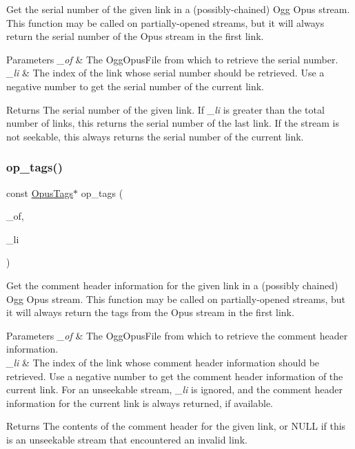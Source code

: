 Get the serial number of the given link in a (possibly-\/chained) Ogg Opus stream. This function may be called on partially-\/opened streams, but it will always return the serial number of the Opus stream in the first link. 
\begin{DoxyParams}{Parameters}
{\em \+\_\+of} & The {\ttfamily Ogg\+Opus\+File} from which to retrieve the serial number. \\
\hline
{\em \+\_\+li} & The index of the link whose serial number should be retrieved. Use a negative number to get the serial number of the current link. \\
\hline
\end{DoxyParams}
\begin{DoxyReturn}{Returns}
The serial number of the given link. If {\itshape \+\_\+li} is greater than the total number of links, this returns the serial number of the last link. If the stream is not seekable, this always returns the serial number of the current link. 
\end{DoxyReturn}
\mbox{\label{group__stream__info_ga4b9b8b62a9fb04aee64c288e106a4822}} 
\subsubsection{\texorpdfstring{op\_tags()}{op\_tags()}}
{\footnotesize\ttfamily const \mbox{\hyperlink{struct_opus_tags}{Opus\+Tags}}$\ast$ op\+\_\+tags (\begin{DoxyParamCaption}\item[{const Ogg\+Opus\+File $\ast$}]{\+\_\+of,  }\item[{int}]{\+\_\+li }\end{DoxyParamCaption})}

Get the comment header information for the given link in a (possibly chained) Ogg Opus stream. This function may be called on partially-\/opened streams, but it will always return the tags from the Opus stream in the first link. 
\begin{DoxyParams}{Parameters}
{\em \+\_\+of} & The {\ttfamily Ogg\+Opus\+File} from which to retrieve the comment header information. \\
\hline
{\em \+\_\+li} & The index of the link whose comment header information should be retrieved. Use a negative number to get the comment header information of the current link. For an unseekable stream, {\itshape \+\_\+li} is ignored, and the comment header information for the current link is always returned, if available. \\
\hline
\end{DoxyParams}
\begin{DoxyReturn}{Returns}
The contents of the comment header for the given link, or {\ttfamily N\+U\+LL} if this is an unseekable stream that encountered an invalid link. 
\end{DoxyReturn}
